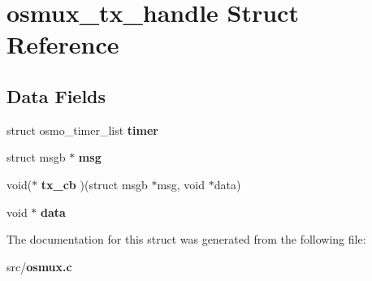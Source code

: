 \section{osmux\+\_\+tx\+\_\+handle Struct Reference}
\label{structosmux__tx__handle}
\subsection*{Data Fields}
\begin{DoxyCompactItemize}
\item 
struct osmo\+\_\+timer\+\_\+list {\bfseries timer}\label{structosmux__tx__handle_a9ad54f4f466be68596dbd49cb1278f9e}

\item 
struct msgb $\ast$ {\bfseries msg}\label{structosmux__tx__handle_a392a6947cfc7c89608943e1558b5553e}

\item 
void($\ast$ {\bfseries tx\+\_\+cb} )(struct msgb $\ast$msg, void $\ast$data)\label{structosmux__tx__handle_ad668c50097e6dd4268d87f646f8b1ac1}

\item 
void $\ast$ {\bfseries data}\label{structosmux__tx__handle_a2a608273e23904a15cae6a5e05bcc2eb}

\end{DoxyCompactItemize}


The documentation for this struct was generated from the following file\+:\begin{DoxyCompactItemize}
\item 
src/{\bf osmux.\+c}\end{DoxyCompactItemize}
